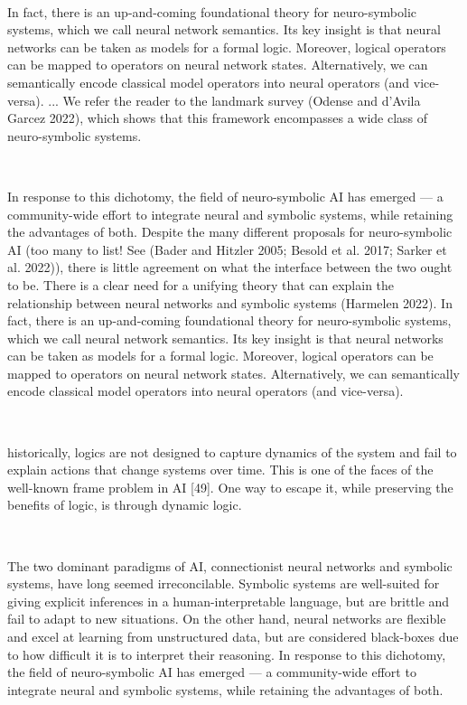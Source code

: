 \documentclass{article}
\newcommand{\textdots}{...}
\newcommand{\tmtextbf}[1]{\text{{\bfseries{#1}}}}
\begin{document}
\

\tmtextbf{Old paper blurb:} In fact, there is an up-and-coming foundational
theory for neuro-symbolic systems, which we call neural network semantics. Its
key insight is that neural networks can be taken as models for a formal logic.
Moreover, logical operators can be mapped to operators on neural network
states. Alternatively, we can semantically encode classical model operators
into neural operators (and vice-versa). {\textdots} We refer the reader to the
landmark survey (Odense and d'Avila Garcez 2022), which shows that this
framework encompasses a wide class of neuro-symbolic systems.

\

In response to this dichotomy, the field of neuro-symbolic AI has emerged ---
a community-wide effort to integrate neural and symbolic systems, while
retaining the advantages of both. Despite the many different proposals for
neuro-symbolic AI (too many to list! See (Bader and Hitzler 2005; Besold et
al. 2017; Sarker et al. 2022)), there is little agreement on what the
interface between the two ought to be. There is a clear need for a unifying
theory that can explain the relationship between neural networks and symbolic
systems (Harmelen 2022). In fact, there is an up-and-coming foundational
theory for neuro-symbolic systems, which we call neural network semantics. Its
key insight is that neural networks can be taken as models for a formal logic.
Moreover, logical operators can be mapped to operators on neural network
states. Alternatively, we can semantically encode classical model operators
into neural operators (and vice-versa).

\

historically, logics are not designed to capture dynamics of the system and
fail to explain actions that change systems over time. This is one of the
faces of the well-known frame problem in AI [49]. One way to escape it, while
preserving the benefits of logic, is through dynamic logic.

\

The two dominant paradigms of AI, connectionist neural networks and symbolic
systems, have long seemed irreconcilable. Symbolic systems are well-suited for
giving explicit inferences in a human-interpretable language, but are brittle
and fail to adapt to new situations. On the other hand, neural networks are
flexible and excel at learning from unstructured data, but are considered
black-boxes due to how difficult it is to interpret their reasoning. In
response to this dichotomy, the field of neuro-symbolic AI has emerged --- a
community-wide effort to integrate neural and symbolic systems, while
retaining the advantages of both.
\end{document}
